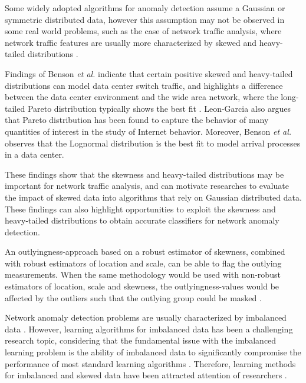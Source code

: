 {Some widely adopted algorithms for anomaly detection assume a Gaussian or symmetric distributed data, however this assumption may not be observed in some real world problems, such as the case of network traffic analysis, where network traffic features are usually more characterized by skewed and heavy-tailed distributions \cite{lakhina2005mining,benson2010network, leon2017probability}.

Findings of Benson \emph{et al.}  \cite{benson2010network} indicate that certain positive skewed and heavy-tailed distributions can model data center switch traffic, and highlights a difference between the data center environment and the wide area network, where the long-tailed Pareto distribution typically shows the best fit \cite{benson2010network}. Leon-Garcia \cite{leon2017probability} also argues that Pareto distribution has been found to capture the behavior of many quantities of interest in the study of Internet behavior. Moreover, Benson \emph{et al.}  \cite{benson2010network} observes that the Lognormal distribution is the best fit to model arrival processes in a data center.

These findings show that the skewness and heavy-tailed distributions may be important for network traffic analysis, and can motivate researches to evaluate the impact of skewed data into algorithms that rely on Gaussian distributed data. These findings can also highlight opportunities to  exploit the skewness and heavy-tailed distributions to obtain accurate classifiers for network anomaly detection.

An outlyingness-approach based on a robust estimator of skewness, combined with robust estimators of location and scale, can be able to flag the outlying measurements. When the same methodology would be used with non-robust estimators of location, scale and skewness, the outlyingness-values would be affected by the outliers such that the outlying group could be masked \cite{hubert2009robustskewed}.

Network anomaly detection problems are usually characterized by imbalanced data \cite{Phua2004minority,he2008learning,benson2010network}. However, learning algorithms for imbalanced data has been a challenging research topic, considering that the fundamental issue with the imbalanced learning problem is the ability of imbalanced data to significantly compromise the performance of most standard learning algorithms \cite{he2008learning}. Therefore, learning methods for imbalanced and skewed data have been attracted attention of researchers \cite{Phua2004minority,hubert2009robustskewed}.

}
